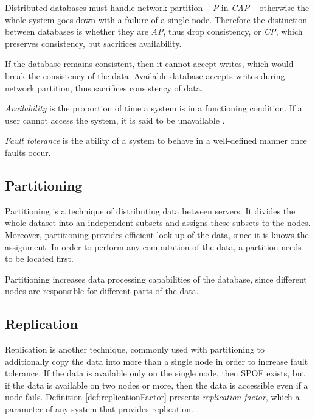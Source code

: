 Distributed databases must handle network partition -- \emph{P} in \emph{CAP} -- otherwise the whole system goes down with a failure of a single node. Therefore the distinction between databases is whether they are \emph{AP}, thus drop consistency, or \emph{CP}, which preserves consistency, but sacrifices availability.

If the database remains consistent, then it cannot accept writes, which would break the consistency of the data. Available database accepts writes during network partition, thus sacrifices consistency of data.

\begin{definition}
	\label{def:availability}
	\emph{Availability} is the proportion of time a system is in a functioning condition. If a user cannot access the system, it is said to be unavailable \cite{DistributeSystemsForFunAndProfit}.	
\end{definition}


\begin{definition}
\label{def:fault-tolerance}
\emph{Fault tolerance} is the ability of a system to behave in a well-defined manner once faults occur. 
\end{definition}

\subsection{Partitioning}
Partitioning is a technique of distributing data between servers. 
It divides the whole dataset into an independent subsets and assigns these subsets to the nodes. 
Moreover, partitioning provides efficient look up of the data, since it is knows the assignment. In order to perform any computation of the data, a partition needs to be located first. 

Partitioning increases data processing capabilities of the database, since different nodes are responsible for different parts of the data. 

\subsection{Replication}
Replication is another technique, commonly used with partitioning to additionally copy the data into more than a single node in order to increase fault tolerance. If the data is available only on the single node, then SPOF exists, but if the data is available on two nodes or more, then the data is accessible even if a node fails. Definition \ref{def:replicationFactor} presents \emph{replication factor}, which a parameter of any system that provides replication.

